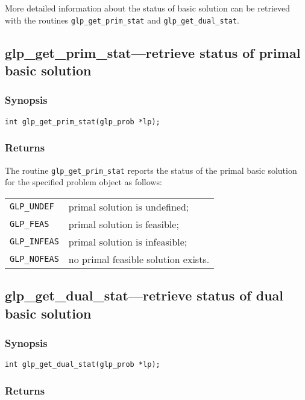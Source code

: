 More detailed information about the status of basic solution can be
retrieved with the routines \verb|glp_get_prim_stat| and
\verb|glp_get_dual_stat|.

\subsection{glp\_get\_prim\_stat---retrieve status of primal basic
solution}

\subsubsection*{Synopsis}

\begin{verbatim}
int glp_get_prim_stat(glp_prob *lp);
\end{verbatim}

\subsubsection*{Returns}

The routine \verb|glp_get_prim_stat| reports the status of the primal
basic solution for the specified problem object as follows:

\begin{tabular}{@{}ll}
\verb|GLP_UNDEF|  & primal solution is undefined; \\
\verb|GLP_FEAS|   & primal solution is feasible; \\
\verb|GLP_INFEAS| & primal solution is infeasible; \\
\verb|GLP_NOFEAS| & no primal feasible solution exists. \\
\end{tabular}

\newpage

\subsection{glp\_get\_dual\_stat---retrieve status of dual basic
solution}

\subsubsection*{Synopsis}

\begin{verbatim}
int glp_get_dual_stat(glp_prob *lp);
\end{verbatim}

\subsubsection*{Returns}

